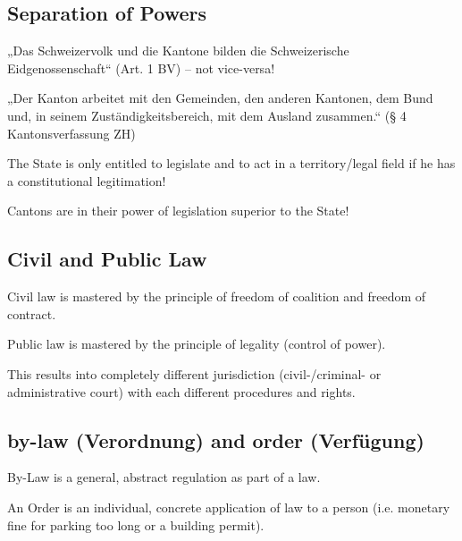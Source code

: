 \subsection{Separation of Powers}
\begin{compactitem}
	\item „Das Schweizervolk und die Kantone bilden die Schweizerische Eidgenossenschaft“ (Art. 1 BV) – not vice-versa!
	\item „Der Kanton arbeitet mit den Gemeinden, den anderen Kantonen, dem Bund und, in seinem Zuständigkeitsbereich, mit dem Ausland zusammen.“ (§ 4 Kantonsverfassung ZH)
	\item The State is only entitled to legislate and to act in a territory/legal field if he has a constitutional legitimation!
	\item Cantons are in their power of legislation superior to the State!
\end{compactitem}

\subsection{Civil and Public Law}
\begin{compactitem}
	\item Civil law is mastered by the principle of freedom of coalition and freedom of contract.
	\item Public law is mastered by the principle of legality (control of power).
	\item This results into completely different jurisdiction (civil-/criminal-	or administrative court) with each different procedures and rights.
\end{compactitem}

\subsection{by-law (Verordnung) and order (Verfügung)}
\begin{compactitem}
	\item By-Law is a general, abstract regulation as part of a law.
	\item An Order is an individual, concrete application of law to a person (i.e. monetary fine for parking too long or a
	building permit).
\end{compactitem}

